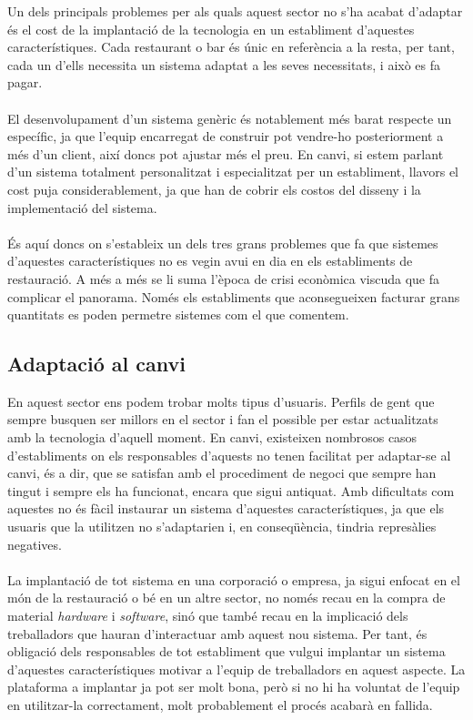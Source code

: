 Un dels principals problemes per als quals aquest sector no s'ha acabat d'adaptar és el cost de la implantació de la tecnologia en un establiment d'aquestes característiques. Cada restaurant o bar és únic en referència a la resta, per tant, cada un d'ells necessita un sistema adaptat a les seves necessitats, i això es fa pagar.
\\\\
El desenvolupament d'un sistema genèric és notablement més barat respecte un específic, ja que l'equip encarregat de construir pot vendre-ho posteriorment a més d'un client, així doncs pot ajustar més el preu. En canvi, si estem parlant d'un sistema totalment personalitzat i especialitzat per un establiment, llavors el cost puja considerablement, ja que han de cobrir els costos del disseny i la implementació del sistema.
\\\\
És aquí doncs on s'estableix un dels tres grans problemes que fa que sistemes d'aquestes característiques no es vegin avui en dia en els establiments de restauració. A més a més se li suma l'època de crisi econòmica viscuda que fa complicar el panorama. Només els establiments que aconsegueixen facturar grans quantitats es poden permetre sistemes com el que comentem.

\subsection{Adaptació al canvi}

En aquest sector ens podem trobar molts tipus d'usuaris. Perfils de gent que sempre busquen ser millors en el sector i fan el possible per estar actualitzats amb la tecnologia d'aquell moment. 
En canvi, existeixen nombrosos casos d'establiments on els responsables d'aquests no tenen facilitat per adaptar-se al canvi, és a dir, que se satisfan amb el procediment de negoci que sempre han tingut i sempre els ha funcionat, encara que sigui antiquat. Amb dificultats com aquestes no és fàcil instaurar un sistema d'aquestes característiques, ja que els usuaris que la utilitzen no s'adaptarien i, en conseqüència, tindria represàlies negatives.
\\\\
La implantació de tot sistema en una corporació o empresa, ja sigui enfocat en el món de la restauració o bé en un altre sector, no només recau en la compra de material \textit{hardware} i \textit{software}, sinó que també recau en la implicació dels treballadors que hauran d'interactuar amb aquest nou sistema. Per tant, és obligació dels responsables de tot establiment que vulgui implantar un sistema d'aquestes característiques motivar a l'equip de treballadors en aquest aspecte. La plataforma a implantar ja pot ser molt bona, però si no hi ha voluntat de l'equip en utilitzar-la correctament, molt probablement el procés acabarà en fallida. 

